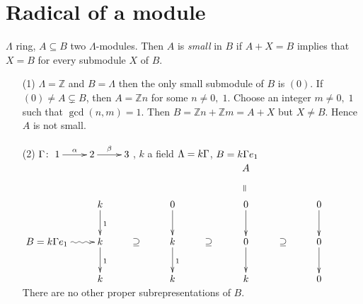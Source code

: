 \section{Radical of a module}
\begin{defin}
$\Lambda$ ring, $A \subseteq B$ two $\Lambda$-modules. Then 
$A$ is \emph{small} in $B$ if $A+X=B$ implies that $X=B$ for every submodule $X$ of $B$. 
\end{defin}

\begin{exam}
\begin{enumerate}
\item[(1)] $\Lambda=\mathbb{Z}$ and $B=\Lambda$ then the only small
  submodule of $B$ is $(0)$. If $(0)\neq A \subsetneq B$, then $A =
  \mathbb{Z}n$ for some $n \neq 0,\; 1$. Choose an integer $m \neq 0,
  \; 1$ such that $\gcd(n, m) = 1$. Then $B = \mathbb{Z}n +
  \mathbb{Z}m = A + X$ but $X \neq B$. Hence $A$ is not small. 

\item[(2)] $\G \colon \xymatrix{1\ar[r]^\alpha & 2\ar[r]^\beta & 3}$, $k$ a field $\Lambda = k\Gamma$, $B=k\Gamma e_1$\\
$\xymatrix{
							&					&			& && A\ar@{}[d]|-*[@]{=} &&\\
							& k \ar@{->}[d]^1 	&			&0\ar@{->}[d]&&0\ar@{->}[d]&&0\ar@{->}[d]\\
B = k\G e_1	\ar@{~>}[r] 	& k \ar@{->}[d]^1 	&\supseteq 	&k\ar@{->}[d]^1&\supseteq&0\ar@{->}[d]&\supseteq&0\ar@{->}[d]\\
						 	& k 				&			&k&&k&&0\\
}$\\
There are no other proper subrepresentations of $B$.


\end{enumerate}
\end{exam}

